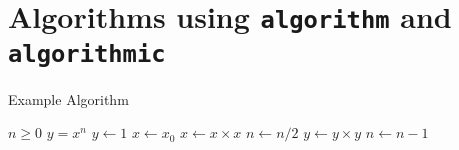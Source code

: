 \documentclass{article}
\begin{document}
	\centering
	\section*{Algorithms using \texttt{algorithm} and \texttt{algorithmic}}
	\begin{algorithm}
		\caption{Example Algorithm}
		\begin{algorithmic}[1]
			\Require $n \geq 0$
			\Ensure $y=x^n$
			\State $y \gets 1$
			\State $x \gets x_0$
					\State $x \gets x \times x$
					\State $n \gets n/2$
				\Else
					\State $y \gets y \times y$
					\State $n \gets n-1$
				\EndIf
			\EndWhile
		\end{algorithmic}
	\end{algorithm}
\end{document}
